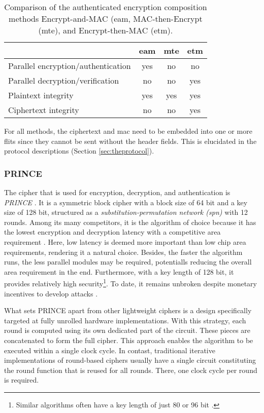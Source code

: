 \begin{table}
    \centering
    \begin{tabulary}{\textwidth}{L|CCC}
        & \gls{eam} & \gls{mte} & \gls{etm} \\\hline
        Parallel encryption/authentication & yes & no & no \\
        Parallel decryption/verification & no & no & yes \\
        Plaintext integrity & yes & yes & yes \\
        Ciphertext integrity & no & no & yes%
    \end{tabulary}
    \caption[Comparison of authenticated encryption composition methods]{Comparison of the authenticated encryption composition methods
    Encrypt-and-MAC (\gls{eam}, MAC-then-Encrypt (\gls{mte}), and Encrypt-then-MAC (\gls{etm}).}
    \label{tab:compositionmethods}
\end{table}

For all methods, the ciphertext and \gls{mac} need to be embedded into one or more flits since they cannot be sent without the header fields. This is
elucidated in the protocol descriptions (Section \ref{sec:theprotocol}).

\subsubsection{PRINCE}\label{subsubsec:prince}
The cipher that is used for encryption, decryption, and authentication is \textit{PRINCE} \cite{borghoff12prince}. It is a symmetric block cipher with
a block size of 64 bit and a key size of 128 bit, structured as a \textit{substitution-permutation network (\gls{spn})} with 12 rounds. Among its many
competitors, it is the algorithm of choice because it has the lowest encryption and decryption latency with a competitive area requirement
\cite{harttung17lightweightcrypto}. Here, low latency is deemed more important than low chip area requirements, rendering it a natural choice. Besides, the
faster the algorithm runs, the less parallel modules may be required, potentialls reducing the overall area requirement in the end. Furthermore, with a
key length of 128 bit, it provides relatively high security\footnote{Similar algorithms often have a key length of just 80 or 96 bit
\cite[5]{harttung17lightweightcrypto}.}. To date, it remains unbroken despite monetary incentives to develop attacks \cite{princechallenge}.

What sets PRINCE apart from other lightweight ciphers is a design specifically targeted at fully unrolled hardware implementations. With this
strategy, each round is computed using its own dedicated part of the circuit. These pieces are concatenated to form the full cipher. This approach
enables the algorithm to be executed within a single clock cycle. In contast, traditional iterative implementations of round-based ciphers usually
have a single circuit constituting the round function that is reused for all rounds. There, one clock cycle per round is required.

